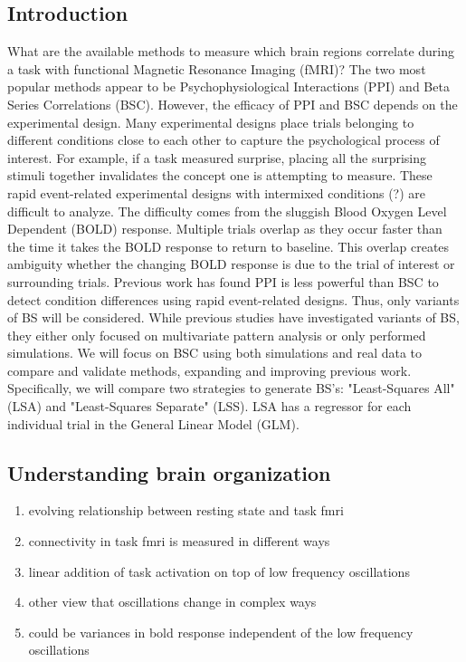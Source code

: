 \documentclass[10pt,letterpaper]{article}
\begin{document}
\subsection{Introduction}
What are the available methods to measure which brain regions correlate during a task with functional Magnetic Resonance Imaging (fMRI)?
The two most popular methods appear to be Psychophysiological Interactions (PPI) and Beta Series Correlations (BSC).
However, the efficacy of PPI and BSC depends on the experimental design.
Many experimental designs place trials belonging to different conditions close to each other
to capture the psychological process of interest.
For example, if a task measured surprise, placing all the surprising stimuli together
invalidates the concept one is attempting to measure.
These rapid event-related experimental designs with intermixed conditions (?) are difficult to analyze.
The difficulty comes from the sluggish Blood Oxygen Level Dependent (BOLD) response.
Multiple trials overlap as they occur faster than the time it takes the BOLD response to return to baseline.
This overlap creates ambiguity whether the changing BOLD response is due to the trial of interest or surrounding trials.
Previous work has found PPI is less powerful than BSC to detect condition differences using rapid event-related designs.
Thus, only variants of BS will be considered.
While previous studies have investigated variants of BS, they either only focused on multivariate pattern analysis
or only performed simulations.
We will focus on BSC using both simulations and real data to compare and validate methods,
expanding and improving previous work.
Specifically, we will compare two strategies to generate BS's: "Least-Squares All" (LSA) and "Least-Squares Separate" (LSS).
LSA has a regressor for each individual trial in the General Linear Model (GLM).
\subsection{Understanding brain organization}
\begin{enumerate}
  \item evolving relationship between resting state and task fmri
  \item connectivity in task fmri is measured in different ways
  \item linear addition of task activation on top of low frequency oscillations
  \item other view that oscillations change in complex ways
  \item could be variances in bold response independent of the low frequency oscillations
\end{enumerate}
\end{document}
